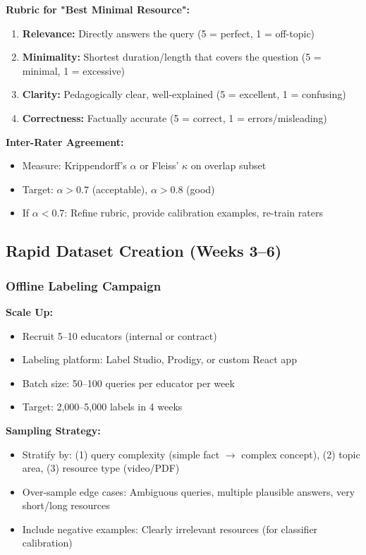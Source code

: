 \documentclass[11pt,letterpaper]{article}
\begin{document}
\textbf{Rubric for "Best Minimal Resource":}
\begin{enumerate}
\item \textbf{Relevance:} Directly answers the query (5 = perfect, 1 = off-topic)
\item \textbf{Minimality:} Shortest duration/length that covers the question (5 = minimal, 1 = excessive)
\item \textbf{Clarity:} Pedagogically clear, well-explained (5 = excellent, 1 = confusing)
\item \textbf{Correctness:} Factually accurate (5 = correct, 1 = errors/misleading)
\end{enumerate}

\textbf{Inter-Rater Agreement:}
\begin{itemize}
\item Measure: Krippendorff's $\alpha$ or Fleiss' $\kappa$ on overlap subset
\item Target: $\alpha > 0.7$ (acceptable), $\alpha > 0.8$ (good)
\item If $\alpha < 0.7$: Refine rubric, provide calibration examples, re-train raters
\end{itemize}

\subsection{Rapid Dataset Creation (Weeks 3--6)}\label{subsec:rapid-dataset-creation}

\subsubsection{Offline Labeling Campaign}\label{subsubsec:offline-labeling}

\textbf{Scale Up:}
\begin{itemize}
\item Recruit 5--10 educators (internal or contract)
\item Labeling platform: Label Studio, Prodigy, or custom React app
\item Batch size: 50--100 queries per educator per week
\item Target: 2,000--5,000 labels in 4 weeks
\end{itemize}

\textbf{Sampling Strategy:}
\begin{itemize}
\item Stratify by: (1) query complexity (simple fact $\rightarrow$ complex concept), (2) topic area, (3) resource type (video/PDF)
\item Over-sample edge cases: Ambiguous queries, multiple plausible answers, very short/long resources
\item Include negative examples: Clearly irrelevant resources (for classifier calibration)
\end{itemize}
\end{document}
